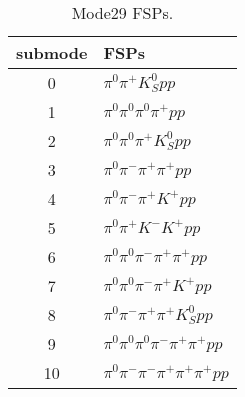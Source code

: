 \begin{table}[h!]
\begin{center}
\begin{tabular}{cl}
\hline
submode& FSPs\\
\hline
0 & $\pi^0 \pi^+ K_S^0 {p} p $ \\
1 & $\pi^0 \pi^0 \pi^0 \pi^+ {p} p $ \\
2 & $\pi^0 \pi^0 \pi^+ K_S^0 {p} p $ \\
3 & $\pi^0 \pi^- \pi^+ \pi^+ {p} p $ \\
4 & $\pi^0 \pi^- \pi^+ K^+ {p} p $ \\
5 & $\pi^0 \pi^+ K^- K^+ {p} p $ \\
6 & $\pi^0 \pi^0 \pi^- \pi^+ \pi^+ {p} p $ \\
7 & $\pi^0 \pi^0 \pi^- \pi^+ K^+ {p} p $ \\
8 & $\pi^0 \pi^- \pi^+ \pi^+ K_S^0 {p} p $ \\
9 & $\pi^0 \pi^0 \pi^0 \pi^- \pi^+ \pi^+ {p} p $ \\
10 & $\pi^0 \pi^- \pi^- \pi^+ \pi^+ \pi^+ {p} p $ \\
\hline
\end{tabular}
\label{tab:Mode29FSPs}
\caption{Mode29 FSPs.}
\end{center}
\end{table}
